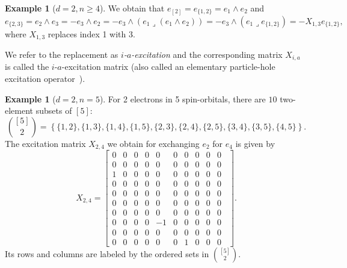 \documentclass[11pt,reqno]{amsart}
\theoremstyle{definition}
\newtheorem{example}[theorem]{Example}
\numberwithin{theorem}{section}
\numberwithin{equation}{section}
\begin{document}
\begin{example}[$d=2,n\geq4 $] 
\label{ex:BasisReplacement}
We obtain that 
$e_{[2]} = e_{\{1,2\}} = e_1 \wedge e_2$
and 
\begin{equation*}
e_{\{2,3\}} 
= e_2 \wedge e_3
= -e_3 \wedge e_2
= -e_3 \wedge (e_1 \lrcorner (e_1 \wedge e_2))
=-e_3 \wedge (e_1 \lrcorner e_{\{1,2\}})
= - X_{1,3} e_{\{1,2\}},
\end{equation*}
where $X_{1,3}$ replaces index 1 with 3.
\end{example}

\noindent We refer to the replacement as {\it $i$-$a$-excitation} and the corresponding matrix $X_{i,a}$ is called the $i$-$a$-excitation matrix (also called an elementary particle-hole excitation operator~\cite{vcivzek1966correlation}). 

\begin{example}[$d=2,n=5$] 
\label{ex:2in5}
For 2 electrons in 5 spin-orbitals, there are $10$ two-element subsets of $[5]$:
\begin{equation*}
{{[5]} \choose {2}}
=
\left\lbrace
\{1,2\},\{1,3\},\{1,4\},\{1,5\},
\{2,3\},\{2,4\},\{2,5\},
\{3,4\},\{3,5\},
\{4,5\}
\right\rbrace.
\end{equation*}
The excitation matrix $X_{2,4}$ we obtain for exchanging $e_2$ for $e_4$ is given by
\begin{equation*}
X_{2,4}
=
\begin{bmatrix}
0 &  0 & 0 & 0 & 0 &    0 &    0 &  0 & 0 & 0 \,\,\, \\
0 &  0 & 0 & 0 & 0 &    0 &    0 &  0 & 0 & 0 \,\,\, \\
1 &  0 & 0 & 0 & 0 &    0 &    0 &  0 & 0 & 0 \,\,\, \\
0 &  0 & 0 & 0 & 0 &    0 &    0 &  0 & 0 & 0 \,\,\, \\
0 &  0 & 0 & 0 & 0 &    0 &    0 &  0 & 0 & 0 \,\,\, \\
0 &  0 & 0 & 0 & 0 &    0 &    0 &  0 & 0 & 0 \,\,\, \\
0 &  0 & 0 & 0 & 0 &    0 &    0 &  0 & 0 & 0 \,\,\, \\
0 &  0 & 0 & 0 &-1 & 0 &   0 &  0 & 0 & 0 \,\,\, \\
0 &  0 & 0 & 0 & 0 & 0 &   0 & 0 & 0 & 0 \, \,\,\\
0 &  0 & 0 & 0 & 0 & 0 & 1 & 0 & 0 & 0 
\end{bmatrix}.
\end{equation*}  
Its rows and columns are labeled by the ordered sets in ${{[5]} \choose {2}}$.
\end{example}
\end{document}
